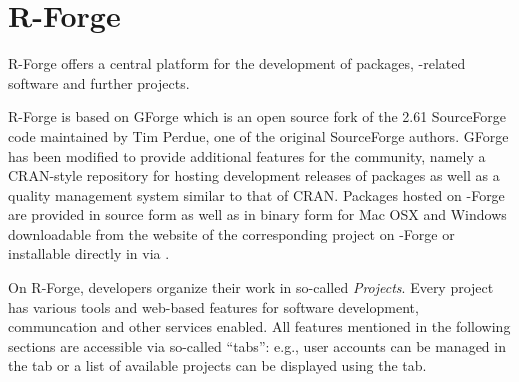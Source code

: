 \section{R-Forge}
R-Forge offers a central platform for the development of \R{}
packages, \R{}-related software and further projects. 

R-Forge is based on GForge \citep{forge:copeland_et_al:2006} which is
an open source fork of the 2.61 SourceForge code maintained by Tim
Perdue, one of the original SourceForge authors. GForge has been
modified to provide additional features for the \R{} community, namely
a CRAN-style repository for hosting development releases of \R{}
packages as well as a quality management system similar to that of
CRAN.
Packages hosted on \R{}-Forge are provided in source form as well as
in binary form for Mac OSX and Windows downloadable from the website
of the corresponding project on \R{}-Forge or installable directly in
\R{} via .






On R-Forge, developers organize their work
in so-called \textit{Projects}. Every project has various tools and
web-based features for software development, communcation and other
services enabled. All features mentioned in the 
following sections are accessible via so-called 
``tabs'': e.g., user accounts can be managed in the  tab or
a list of available projects can be displayed using the
 tab.

